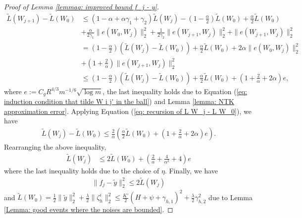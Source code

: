 \documentclass{article} \usepackage{iclr2023/iclr2023_conference,times}
\begin{document}
\begin{proof}[Proof of Lemma \ref{lemmaq: improved bound f_j - y}]
\begin{align}
\tilde{L}(W_{j+1}) - \tilde{L}(W_0) &\leq (1 -\alpha + \alpha \gamma_1 + \gamma_2 )\tilde{L}(W_j) 
- (1 - \frac{\alpha}{2})  \tilde{L}(W_0) + \frac{\alpha}{2} \tilde{L}(W_0)  \nonumber \\
&+ \frac{\alpha}{ 2 \gamma_1} \| e(W_0,W_j) \|_2^2  + \frac{1}{ 2 \gamma_2} \| e(W_{j+1},W_j) \|_2^2 + \|e(W_{j+1},W_j) \|_2^2 \nonumber\\ 
&= (1 - \frac{\alpha}{2} ) \left(\tilde{L}(W_j) 
-   \tilde{L}(W_0) \right) + \frac{\alpha}{2} \tilde{L}(W_0)  + 2 \alpha \| e(W_0,W_j) \|_2^2  \nonumber\\
&+  (1 + \frac{2}{ \alpha}) \| e(W_{j+1},W_j) \|_2^2 \nonumber\\
&\leq (1 - \frac{\alpha}{2} ) \left(\tilde{L}(W_j) -\tilde{L}(W_0) \right)  + \frac{\alpha}{2} \tilde{L}(W_0)  + (1 + \frac{2}{\alpha} + 2 \alpha) e , 
\label{eq: recursion of L W_j - L W_0}
\end{align}
where $e := C_g R^{4/3} m^{-1/6} \sqrt{ \log m}$, the last inequality holds due to Equation (\ref{eq: induction condition that tilde W i j' in the ball}) and Lemma \ref{lemma: NTK approximation error}. Applying Equation (\ref{eq: recursion of L W_j - L W_0}), we have
\begin{align*}
    \tilde{L}(W_j) - \tilde{L}(W_0) \leq \frac{2}{\alpha} \left( \frac{\alpha}{2} \tilde{L}(W_0)  + (1 + \frac{2}{\alpha} + 2 \alpha) e \right). 
\end{align*}
Rearranging the above inequality, 
\begin{align*}
    \tilde{L}(W_j) &\leq 2 \tilde{L}(W_0) + (\frac{2}{\alpha} + \frac{4}{\alpha^2} + 4) e 
\end{align*}
where the last inequality holds due to the choice of $\eta$. 
Finally, we have
\begin{align*}
    \| f_j - \tilde{y}\|_2^2 \leq 2 \tilde{L}(W_j)  
\end{align*}
and $\tilde{L}(W_0) = \frac{1}{2} \| \tilde{y} \|_2^2 + \frac{\lambda}{2} \| \zeta^i_h \|_2^2 \leq  \frac{K'}{2}(H + \psi + \gamma_{h,1} )^2 + \frac{\lambda}{2} \gamma_{h,2}^2$ due to Lemma \ref{Lemma: good events where the noises are bounded}.
\end{proof}
\end{document}
